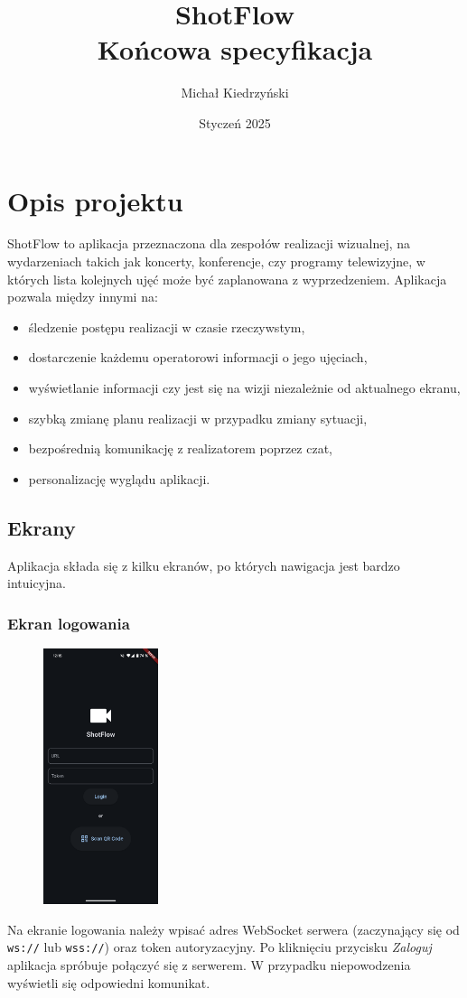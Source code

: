 \documentclass[11pt, letterpaper]{article}
\title{\textbf {ShotFlow} \\ \large Końcowa specyfikacja}
\author{Michał Kiedrzyński}
\date{Styczeń 2025}
\begin{document}
\maketitle

\newpage
\tableofcontents
\newpage

\section{Opis projektu}
ShotFlow to aplikacja przeznaczona dla zespołów realizacji wizualnej, na wydarzeniach takich jak koncerty, konferencje, czy programy telewizyjne, w których lista kolejnych ujęć może być zaplanowana z wyprzedzeniem. Aplikacja pozwala między innymi na:
\begin{itemize}
    \item śledzenie postępu realizacji w czasie rzeczywstym,
    \item dostarczenie każdemu operatorowi informacji o jego ujęciach,
    \item wyświetlanie informacji czy jest się na wizji niezależnie od aktualnego ekranu,
    \item szybką zmianę planu realizacji w przypadku zmiany sytuacji,
    \item bezpośrednią komunikację z realizatorem poprzez czat,
    \item personalizację wyglądu aplikacji.
\end{itemize}

\subsection{Ekrany}
Aplikacja składa się z kilku ekranów, po których nawigacja jest bardzo intuicyjna.
\subsubsection{Ekran logowania}
\begin{figure}[H]
    \centering
    \includegraphics[width=0.3\textwidth]{login.png}
\end{figure}
Na ekranie logowania należy wpisać adres WebSocket serwera (zaczynający się od \texttt{ws://} lub \texttt{wss://}) oraz token autoryzacyjny. Po kliknięciu przycisku \textit{Zaloguj} aplikacja spróbuje połączyć się z serwerem. W przypadku niepowodzenia wyświetli się odpowiedni komunikat.
\end{document}
